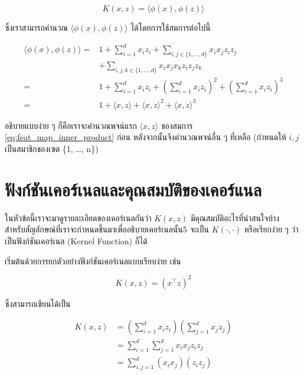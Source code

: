 \begin{equation}
    K(x,z) = \langle\phi(x),\phi(z)\rangle
\end{equation}

\noindent ซึ่งเราสามารถคำนวณ $\langle\phi(x),\phi(z)\rangle$ ได้โดยการใช้สมการต่อไปนี้

\begin{align}
    \langle\phi(x),\phi(z)\rangle =& 1 + \sum_{i=1}^d x_i z_i + \sum_{i,j\in\{1,\ldots,d\}} x_i x_j z_i z_j \\
    &+ \sum_{i,j,k \in \{1,\ldots,d\}} x_i x_j x_k z_i z_j z_k \nonumber \\
    =& 1 + \sum_{i=1}^d x_i z_i + \left(\sum_{i=1}^d x_i z_i \right)^2 + \left( \sum_{i=1}^d x_i z_i \right)^3 \\
    =& 1 + \langle x,z \rangle + \langle x,z \rangle^2 + \langle x,z \rangle^3\label{eq:feat_map_inner_product}
\end{align}

\noindent อธิบายแบบง่าย ๆ ก็คือเราจะคำนวณพจน์แรก $ \langle x,z \rangle$ ของสมการ \ref{eq:feat_map_inner_product} ก่อน 
หลังจากนั้นจึงคำนวณพจน์อื่น ๆ ที่เหลือ (กำหนดให้ $i,j$ เป็นสมาชิกของเซต \{1, \dots, n\})

\section{ฟังก์ชันเคอร์เนลและคุณสมบัติของเคอร์แนล}

ในหัวข้อนี้เราจะมาดูรายละเอียดของเคอร์เนลกันว่า $K(x,z)$ มีคุณสมบัติอะไรที่น่าสนใจบ้าง สำหรับสัญลักษณ์ที่เราจะกำหนดขึ้นมาเพื่ออธิบายเคอร์เนลนั้น5
จะเป็น $K(\cdot,\cdot)$ หรือเรียกง่าย ๆ ว่าเป็นฟังก์ชันเคอร์เนล (Kernel Function) ก็ได้ 

เริ่มต้นด้วยการยกตัวอย่างฟังก์ชันเคอร์เนลแบบเรียบง่าย เช่น

\begin{equation}
    K(x,z) = (x^{\top} z)^{2}
\end{equation}

\noindent ซึ่งสามารถเขียนได้เป็น

\begin{align}
    K(x,z) &= \left( \sum_{i=1}^d x_i z_i \right) \left( \sum_{j=1}^d x_j z_j \right)\\
    &= \sum_{i=1}^d \sum_{j=1}^d x_i x_j z_i z_j\\
    &= \sum_{i,j=1}^d (x_i x_j)(z_i z_j)
\end{align}

